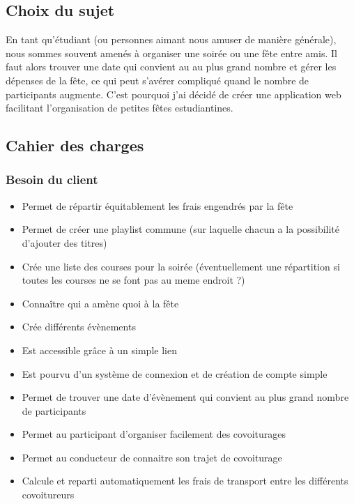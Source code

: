 
\subsection{Choix du sujet}\label{subsec:choix-du-sujet}
En tant qu’étudiant (ou personnes aimant nous amuser de manière générale), nous sommes souvent amenés à organiser une soirée ou une fête entre amis.
Il faut alors trouver une date qui convient au au plus grand nombre et gérer les dépenses de la fête, ce qui peut s'avérer compliqué quand le nombre de participants augmente.
C’est pourquoi j’ai décidé de créer une application web facilitant l’organisation de petites fêtes estudiantines.

\subsection{Cahier des charges}\label{subsec:cahier-des-charges}

\subsubsection{Besoin du client}
\begin{itemize}
    \item Permet de répartir équitablement les frais engendrés par la fête
    \item Permet de créer une playlist commune (sur laquelle chacun a la possibilité d'ajouter des titres)
    \item Crée une liste des courses pour la soirée (éventuellement une répartition si toutes les courses ne se font pas au meme endroit ?)
    \item Connaître qui a amène quoi à la fête
    \item Crée différents évènements
    \item Est accessible grâce à un simple lien
    \item Est pourvu d'un système de connexion et de création de compte simple
    \item Permet de trouver une date d’évènement qui convient au plus grand nombre de participants
    \item Permet au participant d'organiser facilement des covoiturages
    \item Permet au conducteur de connaitre son trajet de covoiturage
    \item Calcule et reparti automatiquement les frais de transport entre les différents covoitureurs
\end{itemize}

